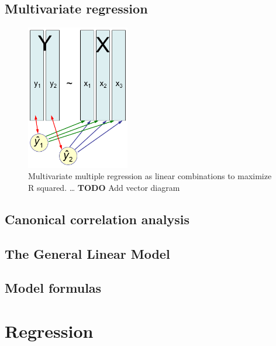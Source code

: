 \documentclass[
  letterpaper,
  10pt,
  krantz2]{krantz}
\begin{document}
\hypertarget{multivariate-regression}{%
\subsection{Multivariate regression}\label{multivariate-regression}}

\begin{figure}

{\centering \includegraphics[width=0.4\textwidth,height=\textheight]{images/lin-comb3.png}

}

\caption{\label{fig-lin-comb3}Multivariate multiple regression as linear
combinations to maximize R squared. \ldots{} \textbf{TODO} Add vector
diagram}

\end{figure}

\hypertarget{canonical-correlation-analysis}{%
\subsection{Canonical correlation
analysis}\label{canonical-correlation-analysis}}

\hypertarget{the-general-linear-model}{%
\subsection{The General Linear Model}\label{the-general-linear-model}}

\hypertarget{model-formulas}{%
\subsection{Model formulas}\label{model-formulas}}

\hypertarget{regression}{%
\section{Regression}\label{regression}}
\end{document}
